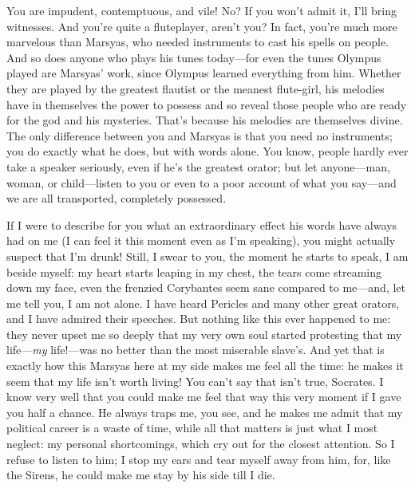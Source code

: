 You are impudent, contemptuous, and vile! No? If you won’t admit it,
I’ll bring witnesses. And you’re quite a fluteplayer, aren’t you? In
fact, you’re much more marvelous than Marsyas, who needed instruments to
 cast his spells on people. And so does anyone who plays his
tunes today---for even the tunes
Olympus played are
Marsyas’ work, since Olympus learned everything from him. Whether they
are played by the greatest flautist or the meanest flute-girl, his
melodies have in themselves the power to possess and so reveal those
people who are ready for the god and his mysteries. That’s because his
melodies are themselves divine. The only difference between you and
Marsyas is that you need no instruments; you do exactly what he does,
but with words alone. You know, people hardly  ever take a
speaker seriously, even if he’s the greatest orator; but let
anyone---man, woman, or child---listen to you or even to a poor account
of what you say---and we are all transported, completely possessed.

If I were to describe for you what an extraordinary effect his words
have always had on me (I can feel it this moment even as I’m speaking),
 you might actually suspect that I’m drunk! Still, I swear to
you, the moment he starts to speak, I am beside myself: my heart starts
leaping in my chest, the tears come streaming down my face, even the
frenzied Corybantes
seem sane compared to me---and, let me tell you, I am not alone. I have
heard Pericles and many other great orators, and I have admired their
speeches. But nothing like this ever happened to me: they never upset me
so deeply that my very own soul started protesting that my
life---{\em my} life!---was no better than the most miserable slave’s.
And yet that is exactly how  this Marsyas here at my side
makes me feel all the time: he makes it seem that my life isn’t worth
living! You can’t say that isn’t true, Socrates. I know very well that
you could make me feel that way this very moment if I gave you half a
chance. He always traps me, you see, and he makes me admit that my
political career is a waste of time, while all that matters is just what
I most neglect: my personal shortcomings, which cry out for the closest
attention. So I refuse to listen to him; I stop my ears and tear 
myself away from him, for, like the Sirens, he could make me stay by his
side till I die.

